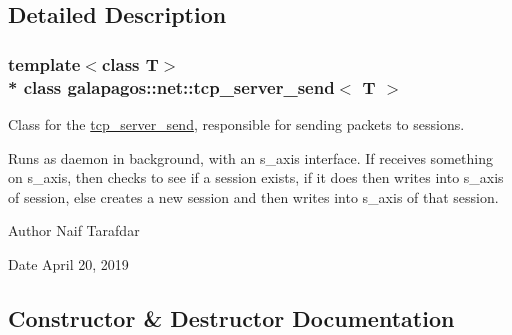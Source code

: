 \subsection{Detailed Description}
\subsubsection*{template$<$class T$>$\\*
class galapagos\+::net\+::tcp\+\_\+server\+\_\+send$<$ T $>$}

Class for the \hyperlink{classgalapagos_1_1net_1_1tcp__server__send}{tcp\+\_\+server\+\_\+send}, responsible for sending packets to sessions. 

Runs as daemon in background, with an s\+\_\+axis interface. If receives something on s\+\_\+axis, then checks to see if a session exists, if it does then writes into s\+\_\+axis of session, else creates a new session and then writes into s\+\_\+axis of that session. \begin{DoxyAuthor}{Author}
Naif Tarafdar 
\end{DoxyAuthor}
\begin{DoxyDate}{Date}
April 20, 2019 
\end{DoxyDate}


\subsection{Constructor \& Destructor Documentation}
